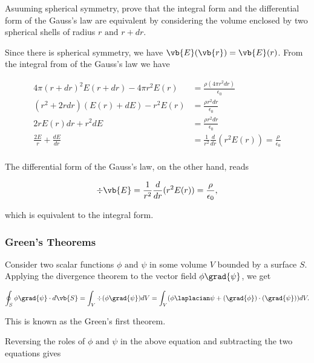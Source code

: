 \documentclass[english,a4paper,12pt]{report}
\begin{document}
{Asuuming spherical symmetry, prove that the integral form and the differential form of the Gauss's law are equivalent by considering the volume enclosed by two spherical shells of radius \(r \text { and } r+ dr\).   }
{Since there is spherical symmetry, we have \(\vb{E} (\vb{r} ) = \vb{E} (r)\). From the integral from of the Gauss's law we have

\begin{equation}
	\begin{aligned} 
	4\pi (r+dr)^2 E(r+dr) - 4\pi r^2 E(r) &= \frac{\rho (4\pi r^2dr)}{\epsilon_0 }\\
	(r^2+2rdr)(E(r)+dE) - r^2E(r) &= \frac{\rho r^2dr}{\epsilon_0 }\\
	2rE(r)dr +r^2dE &= \frac{\rho r^2dr}{\epsilon_0 }\\
	\frac{2E}{r} + \frac{dE}{dr} &= \frac{1}{r^2} \frac{d}{dr}(r^2E(r)) = \frac{\rho }{\epsilon_0 }\\     
	\end{aligned} 
\end{equation}

The differential form of the Gauss's law, on the other hand, reads

\begin{equation}
	\div{\vb{E} } = \frac{1}{r^2} \frac{d}{dr} ( r^2E(r)) = \frac{\rho }{\epsilon_0 },    
\end{equation}

which is equivalent to the integral form.


} 


\subsubsection{Green's Theorems}

Consider two scalar functions \(\phi \text { and } \psi \) in some volume \(V\) bounded by a surface \(S\). Applying the divergence theorem to the vector field \(\phi \grad{\psi } \), we get 

\begin{equation}
	\oint_{S} \phi \grad{\psi } \cdot d\vb{S} = \int_{V}^{} \div{(\phi \grad{\psi } )}dV = \int_{V}^{} (\phi \laplacian \psi +(\grad{\phi } )\cdot (\grad{\psi } ))dV.   
\end{equation}

This is known as the Green's first theorem. 

Reversing the roles of \(\phi \text { and } \psi \) in the above equation and subtracting the two equations gives
\end{document}
